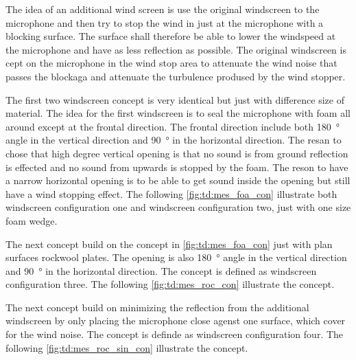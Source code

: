 The idea of an additional wind screen is use the original windscreen to the microphone and then try to stop the wind in just at the microphone with a blocking surface. The surface shall therefore be able to lower the windspeed at the microphone and have as less reflection as possible. The original windscreen is cept on the microphone in the wind stop area to attenuate the wind noise that passes the blockaga and attenuate the turbulence prodused by the wind stopper. 

    
    
The first two windscreen concept is very identical but just with difference size of material. The idea for the first windscreen is to seal the microphone with foam all around except at the frontal direction. The frontal direction include both \SI{180}{\degree} angle in the vertical direction and \SI{90}{\degree} in the horizontal direction. The resan to chose that high degree vertical opening is that no sound is from ground reflection is effected and no sound from upwards is stopped by the foam. The reson to have a narrow horizontal  opening is to be able to get sound inside the opening but still have a wind stopping effect. The following \autoref{fig:td:mes_foa_con} illustrate both windscreen configuration one and windscreen configuration two, just with one size foam wedge.
    

The next concept build on the concept in \autoref{fig:td:mes_foa_con} just with plan surfaces rockwool plates. The opening is also \SI{180}{\degree} angle in the vertical direction and \SI{90}{\degree} in the horizontal direction. The concept is defined as windscreen configuration three. The following \autoref{fig:td:mes_roc_con} illustrate the concept.



The next concept build on minimizing the reflection from the additional windscreen by only placing the microphone close agenst one surface, which cover for the wind noise. The concept is definde as windscreen configuration four. The following \autoref{fig:td:mes_roc_sin_con} illustrate the concept.


